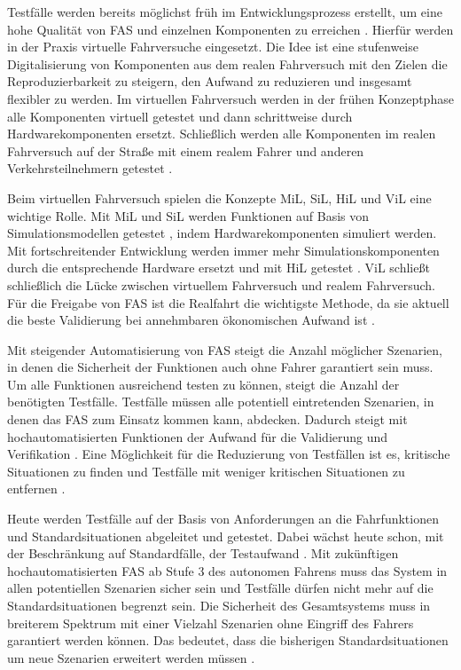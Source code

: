 Testfälle werden bereits möglichst früh im Entwicklungsprozess erstellt, um eine hohe Qualität von \ac{FAS} und einzelnen Komponenten zu erreichen \cite{wachenfeld2015freigabe}. Hierfür werden in der Praxis virtuelle Fahrversuche eingesetzt. Die Idee ist eine stufenweise Digitalisierung von Komponenten aus dem realen Fahrversuch mit den Zielen die Reproduzierbarkeit zu steigern, den Aufwand zu reduzieren und insgesamt flexibler zu werden. Im virtuellen Fahrversuch werden in der frühen Konzeptphase alle Komponenten virtuell getestet und dann schrittweise durch Hardwarekomponenten ersetzt. Schließlich werden alle Komponenten im realen Fahrversuch auf der Straße mit einem realem Fahrer und anderen Verkehrsteilnehmern getestet \cite{hakuli2015virtuelle}.

Beim virtuellen Fahrversuch spielen die Konzepte \ac{MiL}, \ac{SiL}, \ac{HiL} und \ac{ViL} eine wichtige Rolle. Mit \ac{MiL} und \ac{SiL} werden Funktionen auf Basis von Simulationsmodellen getestet \cite{berg2015vehicle}, indem Hardwarekomponenten simuliert werden. Mit fortschreitender Entwicklung werden immer mehr Simulationskomponenten durch die entsprechende Hardware ersetzt und mit \ac{HiL} getestet \cite{hakuli2015virtuelle}. \ac{ViL} schließt schließlich die Lücke zwischen virtuellem Fahrversuch und realem Fahrversuch. Für die Freigabe von \ac{FAS} ist die Realfahrt die wichtigste Methode, da sie aktuell die beste Validierung bei annehmbaren ökonomischen Aufwand ist \cite{wachenfeld2015freigabe}.

Mit steigender Automatisierung von \ac{FAS} steigt die Anzahl möglicher Szenarien, in denen die Sicherheit der Funktionen auch ohne Fahrer garantiert sein muss. Um alle Funktionen ausreichend testen zu können, steigt die Anzahl der benötigten Testfälle. Testfälle müssen alle potentiell eintretenden Szenarien, in denen das \ac{FAS} zum Einsatz kommen kann, abdecken. Dadurch steigt mit hochautomatisierten Funktionen der Aufwand für die Validierung und Verifikation \cite{bach2017reactive}. Eine Möglichkeit für die Reduzierung von Testfällen ist es, kritische Situationen zu finden und Testfälle mit weniger kritischen Situationen zu entfernen \cite{wachenfeld2015freigabe}.

Heute werden Testfälle auf der Basis von Anforderungen an die Fahrfunktionen und Standardsituationen abgeleitet und getestet. Dabei wächst heute schon, mit der Beschränkung auf Standardfälle, der Testaufwand \cite{surmund2018neue}. Mit zukünftigen hochautomatisierten \ac{FAS} ab Stufe 3 des autonomen Fahrens muss das System in allen potentiellen Szenarien sicher sein und Testfälle dürfen nicht mehr auf die Standardsituationen begrenzt sein. Die Sicherheit des Gesamtsystems muss in breiterem Spektrum mit einer Vielzahl Szenarien ohne Eingriff des Fahrers garantiert werden können. Das bedeutet, dass die bisherigen Standardsituationen um neue Szenarien erweitert werden müssen \cite{surmund2018neue}.

